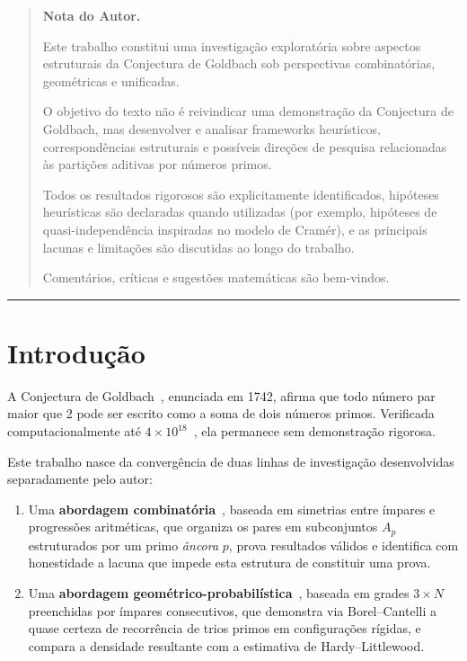 \documentclass[12pt,a4paper]{article}
\theoremstyle{remark}
\begin{document}
	\begin{quote}
		\textbf{Nota do Autor.} 
		
		Este trabalho constitui uma investigação exploratória sobre aspectos estruturais da Conjectura de Goldbach sob perspectivas combinatórias, geométricas e unificadas.
		
		O objetivo do texto não é reivindicar uma demonstração da Conjectura de Goldbach, mas desenvolver e analisar frameworks heurísticos, correspondências estruturais e possíveis direções de pesquisa relacionadas às partições aditivas por números primos.
		
		Todos os resultados rigorosos são explicitamente identificados, hipóteses heurísticas são declaradas quando utilizadas (por exemplo, hipóteses de quasi-independência inspiradas no modelo de Cramér), e as principais lacunas e limitações são discutidas ao longo do trabalho.
		
		Comentários, críticas e sugestões matemáticas são bem-vindos.
	\end{quote}
	
	\setcounter{tocdepth}{2}
	\tableofcontents
	
	\bigskip
	\hrule
	\bigskip
	
	\section{Introdu\c{c}\~ao}
	
	A Conjectura de Goldbach~\cite{goldbach1742}, enunciada em 1742, afirma que todo n\'umero
	par maior que 2 pode ser escrito como a soma de dois n\'umeros primos.
	Verificada computacionalmente at\'e $4\times 10^{18}$~\cite{oliveira2014},
	ela permanece sem demonstra\c{c}\~ao rigorosa.
	
	Este trabalho nasce da converg\^encia de duas linhas de investiga\c{c}\~ao desenvolvidas
	separadamente pelo autor:
	
	\begin{enumerate}[(1)]
		\item Uma \textbf{abordagem combinat\'oria}~\cite{bandeira2026estrutura}, baseada em simetrias
		entre \'impares e progress\~oes aritm\'eticas, que organiza os pares em subconjuntos
		$A_p$ estruturados por um primo \emph{\^ancora} $p$, prova resultados v\'alidos
		e identifica com honestidade a lacuna que impede esta estrutura de constituir uma prova.
		
		\item Uma \textbf{abordagem geom\'etrico-probabil\'istica}~\cite{bandeira2026geometrica},
		baseada em grades $3\times N$ preenchidas por \'impares consecutivos, que demonstra
		via Borel--Cantelli a quase certeza de recorr\^encia de trios primos em configura\c{c}\~oes
		r\'igidas, e compara a densidade resultante com a estimativa de Hardy--Littlewood.
	\end{enumerate}
	
\end{document}

